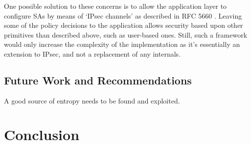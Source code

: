\documentclass[final,a4paper,twoside,11pt,onecolumn]{report}
\begin{document}
One possible solution to these concerns is to allow the application layer to configure SAs by means of `IPsec channels' as described in RFC 5660 \cite{rfc5660}. Leaving some of the policy decisions to the application allows security based upon other primitives than described above, such as user-based ones. Still, such a framework would only increase the complexity of the implementation as it's essentially an extension to IPsec, and not a replacement of any internals.








\section{Future Work and Recommendations}
\label{sec:fw}

A good source of entropy needs to be found and exploited.


   
\chapter{Conclusion}






\end{document}
